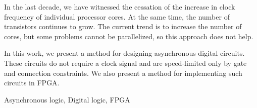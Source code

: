 
\abstract
In the last decade, we have witnessed the cessation of the increase in clock frequency of individual processor cores. At the same time, the number of transistors continues to grow. The current trend is to increase the number of cores, but some problems cannot be parallelized, so this approach does not help.

In this work, we present a method for designing asynchronous digital circuits. These circuits do not require a clock signal and are speed-limited only by gate and connection constraints. We also present a method for implementing such circuits in FPGA.

\keywords
Asynchronous logic, Digital logic, FPGA

